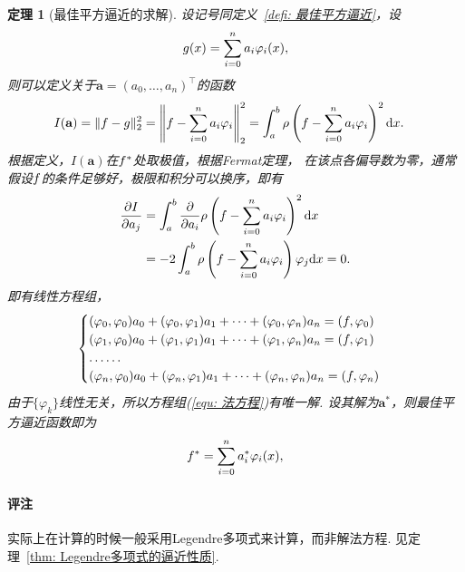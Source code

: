 \documentclass[12pt, a4paper]{article}
\theoremstyle{margin}
\newtheorem{thm}{定理}
\newcommand{\tr}{^\intercal}
\newcommand{\tbf}{\textbf}
\newcommand{\f}{\mathnormal{f}}
\newcommand{\g}{\mathnormal{g}}
\newcommand{\rd}{\mathrm{d}}
\newcommand\thmref[1]{定理~\ref{#1}}
\newcommand\defref[1]{定义~\ref{#1}}
\newcommand\equref[1]{(\ref{#1})}
\newcommand{\remark}{\paragraph{评注}}
\begin{document}
  \begin{thm}[最佳平方逼近的求解]
    设记号同\defref{defi: 最佳平方逼近}，设
    \[
      \g(x) = \sum_{i=0}^na_i\varphi_i(x),
    \]
    则可以定义关于$\tbf{a} = (a_0,\dots,a_n)\tr$的函数
    \[\begin{split}
      I(\tbf{a}) = \|\f-\g\|_2^2 &=
      \left\|\f - \sum_{i=0}^na_i\varphi_i\right\|_2^2
      =  \int_a^b \rho\left( \f-\sum_{i=0}^n a_i\varphi_i \right)^2 \rd x.
    \end{split}\]
    根据定义，$I(\tbf{a})$在$\f^*$处取极值，根据Fermat定理，
    在该点各偏导数为零，通常假设$\f$的条件足够好，极限和积分可以换序，即有
    \[\begin{split}
      \frac{\partial I}{\partial a_j} &=
      \int_a^b \frac{\partial}{\partial a_i}
      \rho\left( \f-\sum_{i=0}^n a_i\varphi_i \right)^2 \rd x\\
      &= -2\int_a^b\rho\left( \f-\sum_{i=0}^n a_i\varphi_i \right)\varphi_j \rd x
      = 0.
    \end{split}\]
    即有线性方程组，
    \begin{equation}\begin{cases}
      \label{equ: 法方程}
      (\varphi_0, \varphi_0)a_0 + (\varphi_0, \varphi_1)a_1 + \cdots + (\varphi_0, \varphi_n)a_n = (\f, \varphi_0) \\
      (\varphi_1, \varphi_0)a_0 + (\varphi_1, \varphi_1)a_1 + \cdots + (\varphi_1, \varphi_n)a_n = (\f, \varphi_1) \\
      \dots\dots\\
      (\varphi_n, \varphi_0)a_0 + (\varphi_n, \varphi_1)a_1 + \cdots + (\varphi_n, \varphi_n)a_n = (\f, \varphi_n)
    \end{cases}\end{equation}
    由于$\{\varphi_k\}$线性无关，所以方程组\equref{equ: 法方程}有唯一解.
    设其解为$\tbf{a}^*$，则最佳平方逼近函数即为
    \[
      \f^* = \sum_{i=0}^na^*_i\varphi_i(x),
    \]
  \end{thm}
  \remark
    实际上在计算的时候一般采用Legendre多项式来计算，而非解法方程.
    见\thmref{thm: Legendre多项式的逼近性质}.
\end{document}
